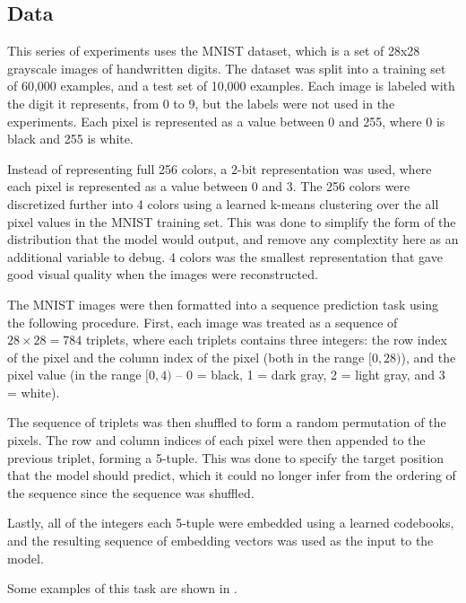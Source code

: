 \subsection{Data}

This series of experiments uses the MNIST dataset, which is a set of 28x28 grayscale images of handwritten digits. The dataset was split into a training set of 60,000 examples, and a test set of 10,000 examples. Each image is labeled with the digit it represents, from 0 to 9, but the labels were not used in the experiments. Each pixel is represented as a value between 0 and 255, where 0 is black and 255 is white.

Instead of representing full 256 colors, a 2-bit representation was used, where each pixel is represented as a value between 0 and 3. The 256 colors were discretized further into 4 colors using a learned k-means clustering over the all pixel values in the MNIST training set. This was done to simplify the form of the distribution that the model would output, and remove any complextity here as an additional variable to debug. 4 colors was the smallest representation that gave good visual quality when the images were reconstructed.

The MNIST images were then formatted into a sequence prediction task using the following procedure. First, each image was treated as a sequence of $28\times28 = 784$ triplets, where each triplets contains three integers: the row index of the pixel and the column index of the pixel (both in the range $[0, 28)$), and the pixel value (in the range $[0, 4)$ -- 0 = black, 1 = dark gray, 2 = light gray, and 3 = white).

The sequence of triplets was then shuffled to form a random permutation of the pixels. The row and column indices of each pixel were then appended to the previous triplet, forming a 5-tuple. This was done to specify the target position that the model should predict, which it could no longer infer from the ordering of the sequence since the sequence was shuffled.

Lastly, all of the integers each 5-tuple were embedded using a learned codebooks, and the resulting sequence of embedding vectors was used as the input to the model.

Some examples of this task are shown in .

